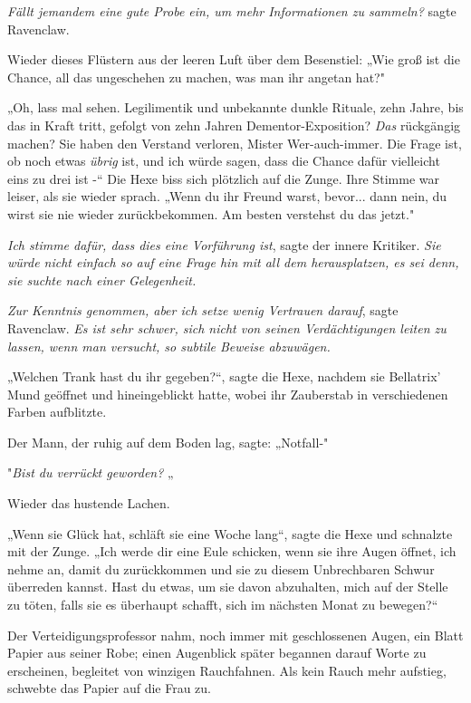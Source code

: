 {\emph{Fällt jemandem eine gute Probe ein, um mehr Informationen zu sammeln?} sagte Ravenclaw.

Wieder dieses Flüstern aus der leeren Luft über dem Besenstiel: „Wie groß ist die Chance, all das ungeschehen zu machen, was man ihr angetan hat?"

„Oh, lass mal sehen. Legilimentik und unbekannte dunkle Rituale, zehn Jahre, bis das in Kraft tritt, gefolgt von zehn Jahren Dementor-Exposition? \emph{Das} rückgängig machen? Sie haben den Verstand verloren, Mister Wer-auch-immer. Die Frage ist, ob noch etwas \emph{übrig} ist, und ich würde sagen, dass die Chance dafür vielleicht eins zu drei ist -“ Die Hexe biss sich plötzlich auf die Zunge. Ihre Stimme war leiser, als sie wieder sprach. „Wenn du ihr Freund warst, bevor... dann nein, du wirst sie nie wieder zurückbekommen. Am besten verstehst du das jetzt."

\emph{Ich stimme dafür, dass dies eine Vorführung ist}, sagte der innere Kritiker. \emph{Sie würde nicht einfach so auf eine Frage hin mit all dem herausplatzen, es sei denn, sie suchte nach einer Gelegenheit.}

\emph{Zur Kenntnis genommen, aber ich setze wenig Vertrauen darauf}, sagte Ravenclaw. \emph{Es ist sehr schwer, sich nicht von seinen Verdächtigungen leiten zu lassen, wenn man versucht, so subtile Beweise abzuwägen.}

„Welchen Trank hast du ihr gegeben?“, sagte die Hexe, nachdem sie Bellatrix' Mund geöffnet und hineingeblickt hatte, wobei ihr Zauberstab in verschiedenen Farben aufblitzte.

Der Mann, der ruhig auf dem Boden lag, sagte: „Notfall-"

"\emph{Bist du verrückt geworden?} „

Wieder das hustende Lachen.

„Wenn sie Glück hat, schläft sie eine Woche lang“, sagte die Hexe und schnalzte mit der Zunge. „Ich werde dir eine Eule schicken, wenn sie ihre Augen öffnet, ich nehme an, damit du zurückkommen und sie zu diesem Unbrechbaren Schwur überreden kannst. Hast du etwas, um sie davon abzuhalten, mich auf der Stelle zu töten, falls sie es überhaupt schafft, sich im nächsten Monat zu bewegen?“

Der Verteidigungsprofessor nahm, noch immer mit geschlossenen Augen, ein Blatt Papier aus seiner Robe; einen Augenblick später begannen darauf Worte zu erscheinen, begleitet von winzigen Rauchfahnen. Als kein Rauch mehr aufstieg, schwebte das Papier auf die Frau zu.

}
